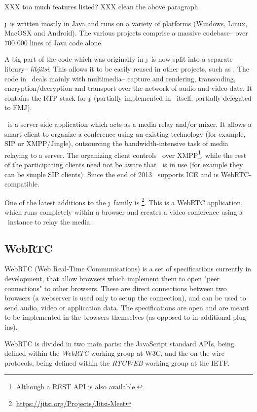 \documentclass[twoside,openright,a4paper,11pt,english]{article}
\begin{document}
XXX too much features listed?
XXX clean the above paragraph

\j\ is written mostly in Java and runs on a variety of
platforms (Windows, Linux, MacOSX and Android). The various projects comprise a massive codebase--
over 700 000 lines of Java code alone.

A big part of the code which was originally in \j\ is now split into a
separate library-- \emph{libjitsi}. This allows it to be easily reused in other
projects, such as \jvb. The code in \lj\ deals mainly with multimedia-- capture and rendering, transcoding, encryption/decryption and transport over the network of audio and video date. It contains the RTP stack for \j\ (partially implemented in \lj\ itself, partially delegated to FMJ).

\jvb\ is a server-side application which acts as a media
relay and/or mixer. It allows a smart client to organize a conference
using an existing technology (for example, SIP or XMPP/Jingle), outsourcing the bandwidth-intensive task of media relaying to a server. 
The organizing client controls \jvb\ over XMPP\footnote{Although a REST API is also available.}, while the rest of the
participating clients need not be aware that \jvb\ is in use (for example they
can be simple SIP clients). Since the end of 2013 \jvb\ supports ICE and is WebRTC-compatible.

One of the latest additions to the \j\ family is
\jm\footnote{\url{https://jitsi.org/Projects/Jitsi-Meet}}. This is a WebRTC %
application, which runs completely within a browser and creates a video
conference using a \jvb\ instance to relay the media.




\subsection{WebRTC}
WebRTC (Web Real-Time Communications) is a set of specifications 
currently in development, that allow browsers which implement them to open
"peer connections" to other browsers. These are direct connections between two
browsers (a webserver is used only to setup the connection), and can be used to
send audio, video or application data. The specifications are open and are meant
to be implemented in the browsers themselves (as opposed to in additional
plug-ins).

WebRTC is divided in two main parts: the JavaScript standard APIs, being defined within
the \emph{WebRTC} working group\cite{webrtc-wg} at W3C,
and the on-the-wire protocols, being defined within
the \emph{RTCWEB} working group\cite{rtcweb-wg} at the IETF.
\end{document}
